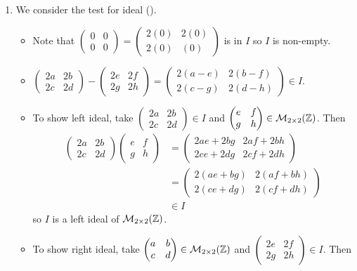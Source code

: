 \begin{enumerate}
    \item We consider the test for ideal ().
    \begin{itemize}
        \item Note that $\begin{pmatrix}0&0\\0&0\end{pmatrix}=\begin{pmatrix}2(0)&2(0)\\2(0)&(0)\end{pmatrix}$ is in $I$ so $I$ is non-empty.
        \item $\begin{pmatrix}2a&2b\\2c&2d\end{pmatrix}-\begin{pmatrix}2e&2f\\2g&2h\end{pmatrix} = \begin{pmatrix}2(a-e)&2(b-f)\\2(c-g)&2(d-h)\end{pmatrix} \in I$.
        \item To show left ideal, take $\begin{pmatrix}2a&2b\\2c&2d\end{pmatrix} \in I$ and $\begin{pmatrix}e&f\\g&h\end{pmatrix} \in \mathcal{M}_{2\times2}(\mathbb{Z})$. Then
        \begin{align*}
            \begin{pmatrix}2a&2b\\2c&2d\end{pmatrix}\begin{pmatrix}e&f\\g&h\end{pmatrix} &= \begin{pmatrix}2ae+2bg&2af+2bh\\2ce+2dg&2cf+2dh\end{pmatrix}\\
            &= \begin{pmatrix}2(ae+bg)&2(af+bh)\\2(ce+dg)&2(cf+dh)\end{pmatrix}\\
            &\in I
        \end{align*}
        so $I$ is a left ideal of $\mathcal{M}_{2\times2}(\mathbb{Z})$.
        \item To show right ideal, take $\begin{pmatrix}a&b\\c&d\end{pmatrix} \in \mathcal{M}_{2\times2}(\mathbb{Z})$ and $\begin{pmatrix}2e&2f\\2g&2h\end{pmatrix} \in I$. Then

\end{itemize}
\end{enumerate}
